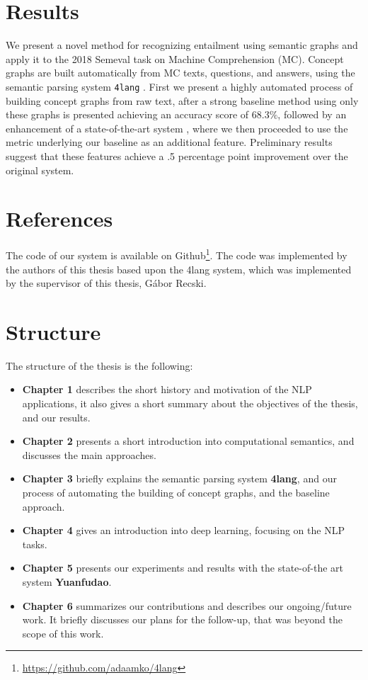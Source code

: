\section{Results}
We present a novel method for recognizing entailment using semantic
graphs and apply it to the 2018 Semeval task on Machine
Comprehension (MC).
Concept graphs are built automatically from MC texts, questions, and answers,
using the semantic parsing system \texttt{4lang} \cite{Recski:2016d}.
First we present a highly automated process of building concept graphs from raw text, after
a strong baseline method using only these graphs is presented achieving an accuracy score of $68.3\%$,
followed by an enhancement of a state-of-the-art system
\cite{Wang:2018}, where we then proceeded to use the metric underlying our baseline as an
additional feature. Preliminary results suggest that these features
achieve a .5 percentage point improvement over the original system.

\section{References}
The code of our system is available on Github\footnote{\url{https://github.com/adaamko/4lang}}. The code was implemented by the authors of this thesis based upon the 4lang system, which was implemented by the supervisor of this thesis, Gábor Recski.

\section{Structure}
The structure of the thesis is the following:
\begin{itemize}
	\item \textbf{Chapter 1} describes the short history and motivation of the NLP applications, it also gives a short summary about the objectives of the thesis, and our results.
	\item \textbf{Chapter 2} presents a short introduction into computational semantics, and discusses the main approaches.
	\item \textbf{Chapter 3} briefly explains the semantic parsing system \textbf{4lang}, and our process of automating the building of concept graphs, and the baseline approach.
	\item \textbf{Chapter 4} gives an introduction into deep learning, focusing on the NLP tasks.
	\item \textbf{Chapter 5} presents our experiments and results with the state-of-the art system \textbf{Yuanfudao}.
	\item \textbf{Chapter 6} summarizes our contributions and describes our ongoing/future work. It briefly discusses our plans for the follow-up, that was beyond the scope of this work.
\end{itemize}